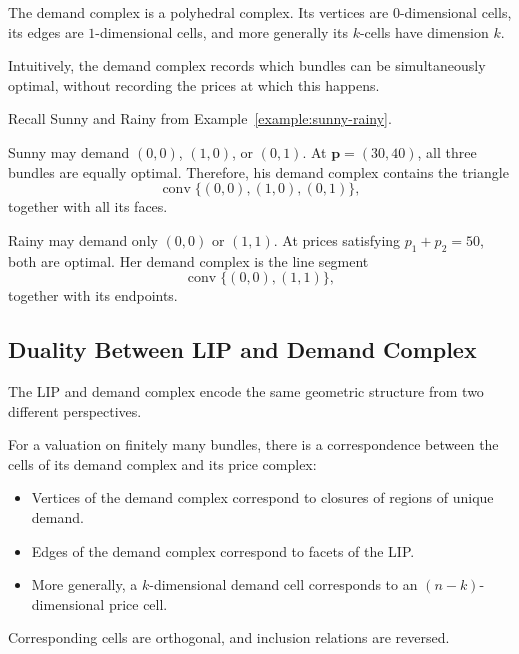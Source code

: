 \documentclass[../../main.tex]{subfiles}
\begin{document}
The demand complex is a polyhedral complex. Its vertices
are $0$-dimensional cells, its edges are $1$-dimensional cells,
and more generally its $k$-cells have dimension $k$.

Intuitively, the demand complex records which bundles can be
simultaneously optimal, without recording the prices at which
this happens.

\begin{example}
    Recall Sunny and Rainy from Example~\ref{example:sunny-rainy}.

    Sunny may demand $(0,0)$, $(1,0)$, or $(0,1)$.
    At $\mathbf{p}=(30,40)$, all three bundles are equally optimal.
    Therefore, his demand complex contains the triangle
    \[
        \operatorname{conv}\{(0,0),(1,0),(0,1)\},
    \]
    together with all its faces.

    Rainy may demand only $(0,0)$ or $(1,1)$.
    At prices satisfying $p_1+p_2=50$, both are optimal.
    Her demand complex is the line segment
    \[
        \operatorname{conv}\{(0,0),(1,1)\},
    \]
    together with its endpoints.

\end{example}

\subsection{Duality Between LIP and Demand Complex}

The LIP and demand complex encode the same geometric
structure from two different perspectives.

\begin{thm}
    For a valuation on finitely many bundles, there is a
    correspondence between the cells of its demand complex 
    and its price complex:
    \begin{itemize}
        \item Vertices of the demand complex correspond to
        closures of regions of unique demand.
        \item Edges of the demand complex correspond to
        facets of the LIP.
        \item More generally, a $k$-dimensional demand cell
        corresponds to an $(n-k)$-dimensional price cell.
    \end{itemize}
    
    Corresponding cells are orthogonal, and inclusion
    relations are reversed.
\end{thm}
\end{document}
